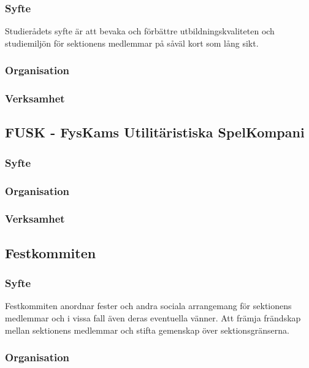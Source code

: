 \documentclass{../resources/dgovdoc}
\begin{document}
\subsubsection{Syfte}

Studierådets syfte är att bevaka och förbättre utbildningskvaliteten och studiemiljön för sektionens medlemmar på såväl kort som lång sikt.

\subsubsection{Organisation}

\subsubsection{Verksamhet}

\subsection{FUSK - FysKams Utilitäristiska SpelKompani}

\subsubsection{Syfte}

\subsubsection{Organisation}

\subsubsection{Verksamhet}

\subsection{Festkommiten}

\subsubsection{Syfte}

Festkommiten anordnar fester och andra sociala arrangemang för sektionens medlemmar och i vissa fall även deras eventuella vänner. Att främja frändskap mellan sektionens medlemmar och stifta gemenskap över sektionsgränserna. 

\subsubsection{Organisation}
\end{document}
